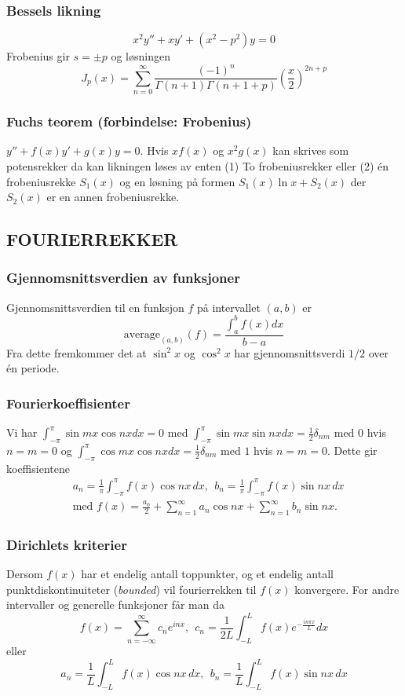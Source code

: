 \documentclass[a4paper, norsk, 8pt]{article}
\newcommand{\EQU}[1] { \begin{equation*} \begin{split}
#1  
\end{split} \end{equation*} }
\begin{document}
\begin{multicols*}{2}
\subsubsection*{\small Bessels likning}
\[ x^2y''+xy'+(x^2-p^2)y=0 \]
Frobenius gir $s=\pm p$ og løsningen 
\[ J_p(x)=\sum_{n=0}^\infty \frac{(-1)^n}{\Gamma(n+1)\Gamma(n+1+p)}\left(\frac{x}{2}\right)^{2n+p} \]

\subsubsection*{\small Fuchs teorem (forbindelse: Frobenius)}
$y''+f(x)y'+g(x)y=0$. Hvis $xf(x)$ og $x^2g(x)$ kan skrives som potensrekker da kan likningen løses av enten (1) To frobeniusrekker eller (2) én frobeniusrekke $S_1(x)$ og en løsning på formen $S_1(x)\ln{x}+S_2(x)$ der $S_2(x)$ er en annen frobeniusrekke.

\subsection*{\footnotesize FOURIERREKKER }
\subsubsection*{\small Gjennomsnittsverdien av funksjoner}
Gjennomsnittsverdien til en funksjon $f$ på intervallet $(a,b)$ er \[ \mbox{average}_{(a,b)}(f)=\frac{\int_a^bf(x)dx}{b-a} \] Fra dette fremkommer det at $\sin^2x$ og $\cos^2x$ har gjennomsnittsverdi $1/2$ over én periode.

\subsubsection*{\small Fourierkoeffisienter}
Vi har $\int_{-\pi}^{\pi}\sin{mx}\cos{nx}dx=0$ med $\int_{-\pi}^{\pi}\sin{mx}\sin{nx}dx=\frac{1}{2}\delta_{nm}$ med $0$ hvis $n=m=0$ og $\int_{-\pi}^{\pi}\cos{mx}\cos{nx}dx=\frac{1}{2}\delta_{nm}$ med $1$ hvis $n=m=0$. Dette gir koeffisientene
\EQU{
& a_n =\frac{1}{\pi}\int_{-\pi}^\pi f(x)\cos{nx}\,dx, \ \ b_n = \frac{1}{\pi}\int_{-\pi}^{\pi}f(x)\sin{nx}\, dx \\
& \mbox{med } f(x)=\frac{a_0}{2}+\sum_{n=1}^\infty a_n \cos nx + \sum_{n=1}^{\infty}b_n \sin nx.
}

\subsubsection*{\small Dirichlets kriterier}
Dersom $f(x)$ har et endelig antall toppunkter, og et endelig antall punktdiskontinuiteter (\textit{bounded}) vil fourierrekken til $f(x)$ konvergere. For andre intervaller og generelle funksjoner  får man da
\[ f(x)=\sum_{n=-\infty}^{\infty}c_n e^{inx}, \ \ c_n=\frac{1}{2L}\int_{-L}^{L}f(x)e^{-\frac{in\pi x}{L}}dx \]
eller
\[  
a_n=\frac{1}{L}\int_{-L}^L f(x)\cos{nx}\,dx, \ \ b_n = \frac{1}{L}\int_{-L}^L f(x)\sin{nx}\, dx
\]


\end{multicols*}
\end{document}
